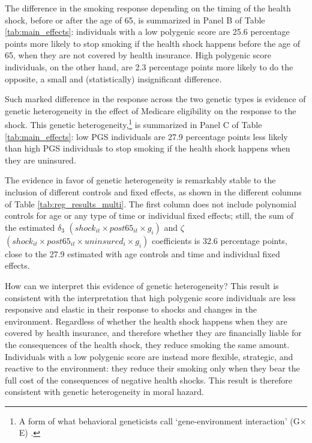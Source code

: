 \documentclass[11pt]{article}
\begin{document}
The difference in the smoking response depending on the timing of the health shock, before or after the age of 65, is summarized in Panel B of Table \ref{tab:main_effects}: individuals with a low polygenic score are 25.6 percentage points more likely to stop smoking if the health shock happens before the age of 65, when they are not covered by health insurance.
High polygenic score individuals, on the other hand, are 2.3 percentage points more likely to do the opposite, a small and (statistically) insignificant difference.

Such marked difference in the response across the two genetic types is evidence of genetic heterogeneity in the effect of Medicare eligibility on the response to the shock.
This genetic heterogeneity,\footnote{A form of what behavioral geneticists call `gene-environment interaction' (G$\times$E) \cite{Haldane1946,Plomin1990}.} is summarized in Panel C of Table \ref{tab:main_effects}: low PGS individuals are 27.9 percentage points less likely than high PGS individuals to stop smoking if the health shock happens when they are uninsured.

The evidence in favor of genetic heterogeneity is remarkably stable to the inclusion of different controls and fixed effects, as shown in the different columns of Table \ref{tab:reg_results_multi}.
The first column does not include polynomial controls for age or any type of time or individual fixed effects; still, the sum of the estimated $\delta_3$ $(shock_{it} \times post65_{it} \times g_i)$ and $\zeta$ $(shock_{it} \times post65_{it} \times uninsured_i \times g_i)$ coefficients is 32.6 percentage points, close to the 27.9 estimated with age controls and time and individual fixed effects.%

How can we interpret this evidence of genetic heterogeneity?
This result is consistent with the interpretation that high polygenic score individuals are less responsive and elastic in their response to shocks and changes in the environment.
Regardless of whether the health shock happens when they are covered by health insurance, and therefore whether they are financially liable for the consequences of the health shock, they reduce smoking the same amount.
Individuals with a low polygenic score are instead more flexible, strategic, and reactive to the environment: they reduce their smoking only when they bear the full cost of the consequences of negative health shocks.
This result is therefore consistent with genetic heterogeneity in moral hazard.
\end{document}
